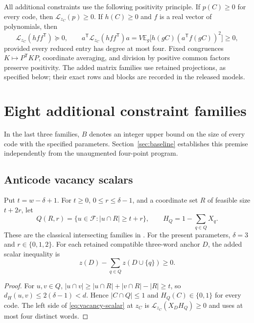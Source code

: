 \documentclass[11pt]{article}
\newcommand{\F}{\mathcal F}
\newcommand{\Lzc}{\mathcal L_{z_C}}
\newcommand{\E}{\mathbb E}
\begin{document}
All additional constraints use the following positivity principle. If
$p(C)\ge0$ for every code, then $\Lzc(p)\ge0$. If $h(C)\ge0$ and $f$ is a real
vector of polynomials, then
\begin{equation}\label{eq:localization}
 \Lzc(hff^{\mathsf T})\succeq0,
 \qquad
 a^{\mathsf T}\Lzc(hff^{\mathsf T})a
 =V\E_g\bigl[h(gC)(a^{\mathsf T}f(gC))^2\bigr]\ge0,
\end{equation}
provided every reduced entry has degree at most four. Fixed congruences
$K\mapsto P^{\mathsf T}KP$, coordinate averaging, and division by positive
common factors preserve positivity. The added matrix families use retained
projections, as specified below; their exact rows and blocks are recorded
in the released models.

\section{Eight additional constraint families}\label{sec:constraints}

In the last three families, $B$ denotes an integer upper bound on the size of
every code with the specified parameters. Section~\ref{sec:baseline}
establishes this premise independently from the unaugmented four-point
program.

\subsection{Anticode vacancy scalars}\label{subsec:vacancy-scalar}

Put $t=w-\delta+1$. For $t\ge0$, $0\le r\le\delta-1$, and a coordinate set
$R$ of feasible size $t+2r$, let
\[
 Q(R,r)=\{u\in\F:|u\cap R|\ge t+r\},\qquad
 H_Q=1-\sum_{q\in Q}X_q.
\]
These are the classical intersecting families in
\cite[eq.~(1.9)]{AhlswedeKhachatrian}. For the present parameters,
$\delta=3$ and $r\in\{0,1,2\}$. For each retained compatible three-word
anchor $D$, the added scalar inequality is
\begin{equation}\label{eq:vacancy-scalar}
 z(D)-\sum_{q\in Q}z(D\cup\{q\})\ge0.
\end{equation}

\begin{proof}
For $u,v\in Q$,
$|u\cap v|\ge|u\cap R|+|v\cap R|-|R|\ge t$, so
$d_H(u,v)\le2(\delta-1)<d$. Hence $|C\cap Q|\le1$ and $H_Q(C)\in\{0,1\}$
for every code. The left side of \eqref{eq:vacancy-scalar} at $z_C$ is
$\Lzc(X_DH_Q)\ge0$ and uses at most four distinct words.
\end{proof}
\end{document}
